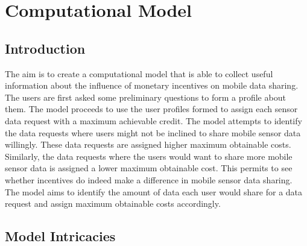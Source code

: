 \chapter{Computational Model} \label{model}

\newcommand{\numcategories}[0]{$cat$ }
\newcommand{\numsubcategories}[0]{$cat$ }
\newcommand{\numsensors}[0]{$N_S$ }
\newcommand{\numstakeholders}[0]{$N_{DC}$ }
\newcommand{\numcontexts}[0]{$N_C$ }
\newcommand{\numquestions}[0]{$N_{DR}$ } 
\newcommand{\numsubfeatures}[0]{$num_{sf}$ } 



\section{Introduction}
The aim is to create a computational model that is able to collect useful information about the influence of monetary incentives on mobile
data sharing.
The users are first asked some preliminary questions to form a profile about them. The model proceeds to use the user profiles 
formed to assign each sensor data request
with a maximum achievable credit. The model attempts to identify the data requests where users might not be inclined to share mobile sensor data willingly. These data requests are assigned higher maximum obtainable costs. Similarly, the data requests where the users would want to share more mobile sensor data
is assigned a lower maximum obtainable cost. This permits to see whether incentives do indeed make a difference in mobile sensor
data sharing. The model aims to identify the amount of data each user would share for a data request and assign maximum obtainable costs accordingly.

\section{Model Intricacies}

